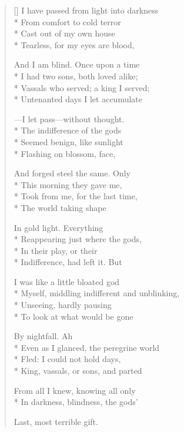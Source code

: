 \label{ch:lear_ax}
\settowidth{\versewidth}{Myself, middling indifferent and unblinking,}
\begin{verse}[\versewidth]
 I have passed from light into darkness\\*
From comfort to cold terror\\*
Cast out of my own house\\*
Tearless, for my eyes are blood,

And I am blind.  Once upon a time\\*
I had two sons, both loved alike;\\*
Vassals who served; a king I served;\\*
Untenanted days I let accumulate

---I let pass---without thought.\\*
The indifference of the gods\\*
Seemed benign, like sunlight\\*
Flashing on blossom, face,

And forged steel the same.  Only\\*
This morning they gave me,\\*
Took from me, for the last time,\\*
The world taking shape

In gold light.  Everything\\*
Reappearing just where the gods,\\*
In their play, or their\\*
Indifference, had left it.  But

I was like a little bloated god\\*
Myself, middling indifferent and unblinking,\\*
Unseeing, hardly pausing\\*
To look at what would be gone

By nightfall.    Ah\\*
Even as I glanced, the peregrine world\\*
Fled: I could not hold days,\\*
King, vassals, or sons, and parted

From all I knew, knowing all only\\*
In darkness, blindness, the gods'

Last, most terrible gift.
\end{verse}
